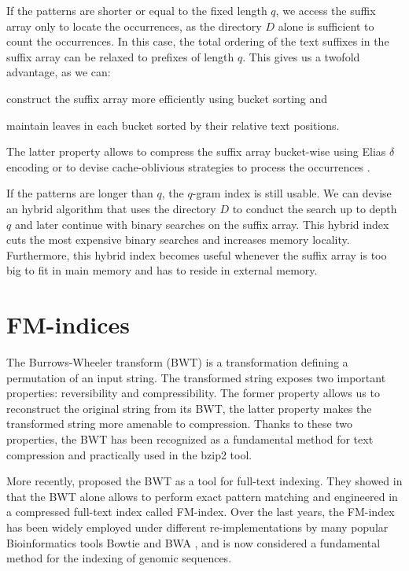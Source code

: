 If the patterns are shorter or equal to the fixed length $q$, we access the suffix array only to locate the occurrences, as the directory $D$ alone is sufficient to count the occurrences.
In this case, the total ordering of the text suffixes in the suffix array can be relaxed to prefixes of length $q$.
This gives us a twofold advantage, as we can:
\begin{inparaenum}[(i)]
\item construct the suffix array more efficiently using bucket sorting and
\item maintain leaves in each bucket sorted by their relative text positions.
\end{inparaenum}
The latter property allows to compress the suffix array bucket-wise \eg using Elias $\delta$ encoding \citep{Elias1975} or to devise cache-oblivious strategies to process the occurrences \citep{Hach2010}.

If the patterns are longer than $q$, the $q$-gram index is still usable.
We can devise an hybrid algorithm that uses the directory $D$ to conduct the search up to depth $q$ and later continue with binary searches on the suffix array.
This hybrid index cuts the most expensive binary searches and increases memory locality.
Furthermore, this hybrid index becomes useful whenever the suffix array is too big to fit in main memory and has to reside in external memory.

\section{FM-indices}

The Burrows-Wheeler transform (BWT) \citep{Burrows1994} is a transformation defining a permutation of an input string.
The transformed string exposes two important properties: reversibility and compressibility.
The former property allows us to reconstruct the original string from its BWT, the latter property makes the transformed string more amenable to compression.
Thanks to these two properties, the BWT has been recognized as a fundamental method for text compression and practically used in the bzip2 \citep{Seward1996} tool.

More recently, \citeauthor{Ferragina2000} proposed the BWT as a tool for full-text indexing.
They showed in \citep{Ferragina2000} that the BWT alone allows to perform exact pattern matching and engineered in \citep{Ferragina2001} a compressed full-text index called FM-index.
Over the last years, the FM-index has been widely employed under different re-implementations by many popular Bioinformatics tools \eg Bowtie \citep{Bowtie} and BWA \citep{BWA}, and is now considered a fundamental method for the indexing of genomic sequences.


